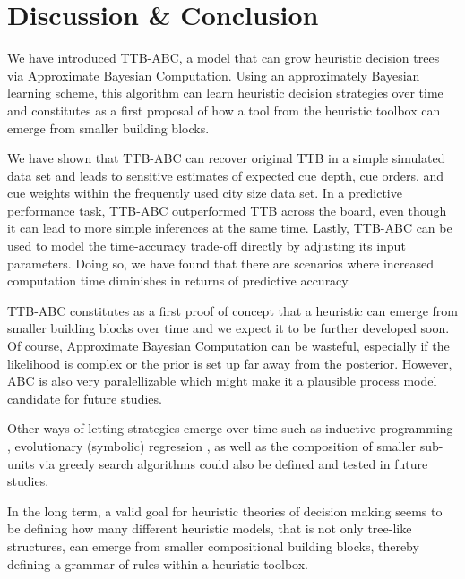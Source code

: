 \documentclass[a4paper,man, natbib]{apa6}
\begin{document}

\section{Discussion \& Conclusion}
We have introduced TTB-ABC, a model that can grow heuristic decision trees via Approximate Bayesian Computation. Using an approximately Bayesian learning scheme, this algorithm can learn heuristic decision strategies over time and constitutes as a first proposal of how a tool from the heuristic toolbox can emerge from smaller building blocks.

We have shown that TTB-ABC can recover original TTB in a simple simulated data set and leads to sensitive estimates of expected cue depth, cue orders, and cue weights within the frequently used city size data set. In a predictive performance task, TTB-ABC outperformed TTB across the board, even though it can lead to more simple inferences at the same time. Lastly, TTB-ABC can be used to model the time-accuracy trade-off directly by adjusting its input parameters. Doing so, we have found that there are scenarios where increased computation time diminishes in returns of predictive accuracy.

TTB-ABC constitutes as a first proof of concept that a heuristic can emerge from smaller building blocks over time and we expect it to be further developed soon. Of course, Approximate Bayesian Computation can be wasteful, especially if the likelihood is complex or the prior is set up far away from the posterior.  However, ABC is also very paralellizable which might make it a plausible process model candidate for future studies. 

Other ways of letting strategies emerge over time such as inductive programming \citep{muggleton1994bayesian}, evolutionary (symbolic) regression \citep{dechter2013bootstrap}, as well as the composition of smaller sub-units via greedy search algorithms \citep{duvenaud2013structure} could also be defined and tested in future studies.

In the long term, a valid goal for heuristic theories of decision making seems to be defining how many different heuristic models, that is not only tree-like structures, can emerge from smaller compositional building blocks, thereby defining a grammar of rules within a heuristic toolbox.



\end{document}
